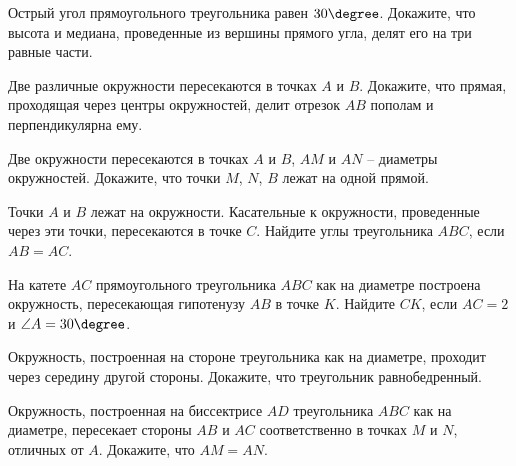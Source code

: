 \begin{enumcols}[label=\textbf{\arabic*.}]
	\item {}
	\item {}
	\item {}
	\item {}
	\item {}
	\item Острый угол прямоугольного треугольника равен \( 30\degree \). Докажите, что высота и медиана, проведенные из вершины прямого угла, делят его на три равные части.
	\item Две различные окружности пересекаются в точках \( A \) и  \( B \). Докажите, что прямая, проходящая через центры окружностей, делит отрезок \( AB \) пополам и перпендикулярна ему.
	\item Две окружности пересекаются в точках \( A \) и \( B \), \( AM \) и \( AN \) -- диаметры окружностей. Докажите, что точки \( M \), \( N \), \( B \) лежат на одной прямой.
	\item Точки \( A \) и \( B \) лежат на окружности. Касательные к окружности, проведенные через эти точки, пересекаются в точке \( C \). Найдите углы треугольника \( ABC \), если \( AB=AC \).
	\item На катете \( AC \) прямоугольного треугольника \( ABC \) как на диаметре построена окружность, пересекающая гипотенузу \( AB \) в точке \( K \). Найдите \( CK \), если \( AC=2 \) и \( \angle A = 30\degree \).
	\item Окружность, построенная на стороне треугольника как на диаметре, проходит через середину другой стороны. Докажите, что треугольник равнобедренный.
	\item Окружность, построенная на биссектрисе \( AD \) треугольника \( ABC \) как на диаметре, пересекает стороны \( AB \) и \( AC \) соответственно в точках \( M \) и \( N \), отличных от \( A \). Докажите, что \( AM = AN \).
\end{enumcols}